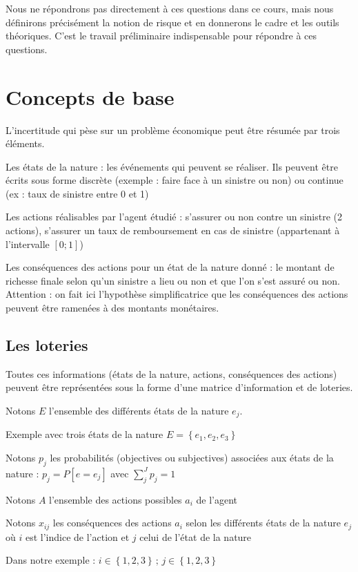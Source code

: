 \documentclass[a4paper, 12pt]{report}
\begin{document}
Nous ne répondrons pas directement à ces questions dans ce cours, mais nous définirons précisément la notion de risque et en donnerons le cadre et les outils théoriques. C'est le travail préliminaire indispensable pour répondre à ces questions.

\chapter{Concepts de base}

L'incertitude qui pèse sur un problème économique peut être résumée par trois éléments. 

Les états de la nature : les événements qui peuvent se réaliser. Ils peuvent être écrits sous forme discrète (exemple : faire face à un sinistre ou non) ou continue (ex : taux de sinistre entre 0 et 1)

Les actions réalisables par l'agent étudié : s'assurer ou non contre un sinistre (2 actions), s'assurer un taux de remboursement en cas de sinistre (appartenant à l'intervalle $[0;1]$)

Les conséquences des actions pour un état de la nature donné : le montant de richesse finale selon qu'un sinistre a lieu ou non et que l'on s'est assuré ou non. Attention : on fait ici l'hypothèse simplificatrice que les conséquences des actions peuvent être ramenées à des montants monétaires.

\section{Les loteries}

Toutes ces informations (états de la nature, actions, conséquences des actions) peuvent être représentées sous la forme d'une matrice d'information et de loteries.

Notons $E$ l'ensemble des différents états de la nature $e_j$. 

Exemple avec trois états de la nature $E=\left\{ e_1,e_2,e_3 \right\}$

Notons $p_j$ les probabilités (objectives ou subjectives) associées aux états de la nature : $p_j=P\left[ e=e_j \right]$ avec $\sum_j^Jp_j=1$

Notons $A$ l'ensemble des actions possibles $a_i$ de l'agent

Notons $x_{ij}$ les conséquences des actions $a_i$ selon les différents
états de la nature $e_j$ où $i$ est l'indice de l'action et $j$ celui de l'état de
la nature

Dans notre exemple : $i\in \left\{ 1,2,3 \right\}\,;\,j\in \left\{ 1,2,3 \right\}$
\end{document}
